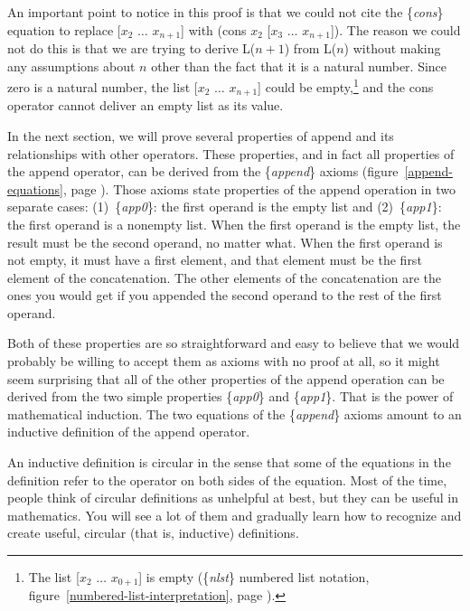 An important point to notice in this proof is that
we could not cite the \{\emph{cons}\} equation to replace \textsf{[$x_2$ $\dots$ $x_{n+1}$]}
with \textsf{(cons $x_2$ [$x_3$ $\dots$ $x_{n+1}$])}.
The reason we could not do this is that we are trying to derive
L($n+1$) from L($n$) without making any assumptions about $n$
other than the fact that it is a natural number.
Since zero is a natural number, the list \textsf{[$x_2$ $\dots$ $x_{n+1}$]}
could be empty,\footnote{The list [$x_2$ $\dots$ $x_{0+1}$] is empty
(\{\emph{nlst}\} numbered list notation,
figure~\ref{numbered-list-interpretation}, page \pageref{numbered-list-interpretation}).}
and the \textsf{cons} operator cannot deliver an empty list as its value.

In the next section, we will prove several properties of \textsf{append}
and its relationships with other operators.
These properties, and in fact all properties of the \textsf{append} operator,
can be derived from the \{\emph{append}\} axioms
(figure~\ref{append-equations}, page \pageref{append-equations}).
Those axioms state properties of the append operation in two separate cases:
(1)~\{\emph{app0}\}: the first operand is the empty list and
(2)~\{\emph{app1}\}: the first operand is a nonempty list.
When the first operand is the empty list,
the result must be the second operand, no matter what.
When the first operand is not empty, it must have a first element,
and that element must be the first element of the concatenation.
The other elements of the concatenation are the ones you would get
if you appended the second operand to the rest of the first operand.

Both of these properties are so straightforward and easy to believe
that we would probably be willing to accept them as axioms with no proof at all,
so it might seem surprising that all of the other properties
of the \textsf{append} operation can be derived from
the two simple properties \{\emph{app0}\} and \{\emph{app1}\}.
That is the power of mathematical induction.
The two equations of the \{\emph{append}\} axioms
amount to an inductive definition of the \textsf{append} operator.

An inductive definition is circular in the sense
that some of the equations in the definition refer
to the operator on both sides of the equation.
Most of the time, people think of circular definitions
as unhelpful at best,
but they can be useful in mathematics.
You will see a lot of them and
gradually learn how to recognize and create useful,
circular (that is, inductive) definitions.


